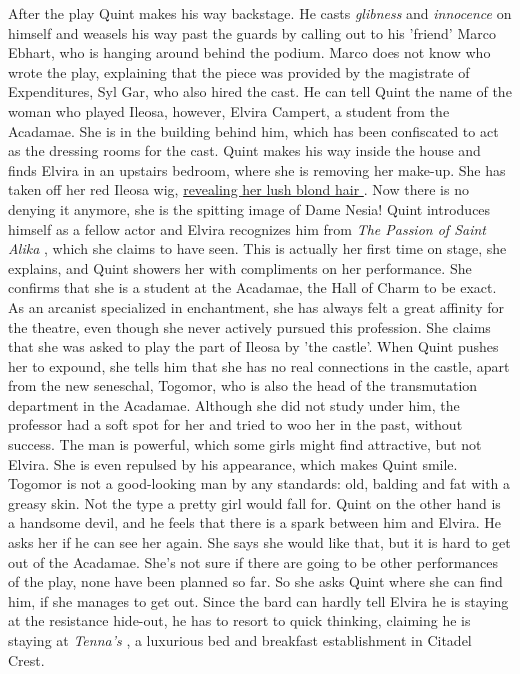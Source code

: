 After the play Quint makes his way backstage. He casts {\itshape glibness} and  {\itshape innocence} on himself and  weasels his way past the guards by calling out to his 'friend' Marco Ebhart, who is hanging around behind the podium. Marco does not know who wrote the play, explaining that the piece was provided by the magistrate of Expenditures, Syl Gar, who also hired the cast. He can tell Quint the name of the woman who played Ileosa, however, Elvira Campert, a student from the Acadamae. She is in the building behind him, which has been confiscated to act as the dressing rooms for the cast. Quint makes his way inside the house and finds Elvira in an upstairs bedroom, where she is removing her make-up. She has taken off her red Ileosa wig, \hyperref[fig:Noir-79828039]{ revealing her lush blond hair } . Now there is no denying it anymore, she is the spitting image of Dame Nesia! Quint introduces himself as a fellow actor and Elvira recognizes him from  {\itshape The Passion of Saint Alika} , which she claims to have seen. This is actually her first time on stage, she explains, and Quint showers her with compliments on her performance. She confirms that she is a student at the Acadamae, the Hall of Charm to be exact. As an arcanist specialized in enchantment, she has always felt a great affinity for the theatre, even though she never actively pursued this profession. She claims that she was asked to play the part of Ileosa by 'the castle'. When Quint pushes her to expound, she tells him that she has no real connections in the castle, apart from the new seneschal, Togomor, who is also the head of the transmutation department in the Acadamae. Although she did not study under him, the professor had a soft spot for her and tried to woo her in the past, without success. The man is powerful, which some girls might find attractive, but not Elvira. She is even repulsed by his appearance, which makes Quint smile. Togomor is not a good-looking man by any standards: old, balding and fat with a greasy skin. Not the type a pretty girl would fall for. Quint on the other hand is a handsome devil, and he feels that there is a spark between him and Elvira. He asks her if he can see her again. She says she would like that, but it is hard to get out of the Acadamae. She's not sure if there are going to be other performances of the play, none have been planned so far. So she asks Quint where she can find him, if she manages to get out. Since the bard can hardly tell Elvira he is staying at the resistance hide-out, he has to resort to quick thinking, claiming he is staying at  {\itshape Tenna's} , a luxurious bed and breakfast establishment in Citadel Crest. \\

